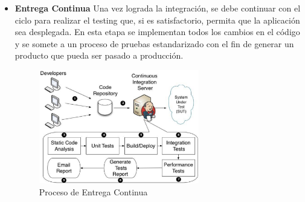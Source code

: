 \documentclass[preprint,12pt]{elsarticle}
\begin{document}
\begin{itemize}
\item \textbf{Entrega Continua}
Una vez lograda la integración, se debe continuar con el ciclo para realizar el testing que, si es satisfactorio, permita que la aplicación sea desplegada.
En esta etapa se implementan todos los cambios en el código y se somete a un proceso de pruebas estandarizado con el fin de generar un producto que pueda ser pasado a producción.
\begin{figure}[htb]
	\begin{center}
		\includegraphics[width=7cm]{./IMAGENES/proceso_entrega_continua} 
		\caption{Proceso de Entrega Continua}
	\end{center}
\end{figure}



\end{itemize}
\end{document}
